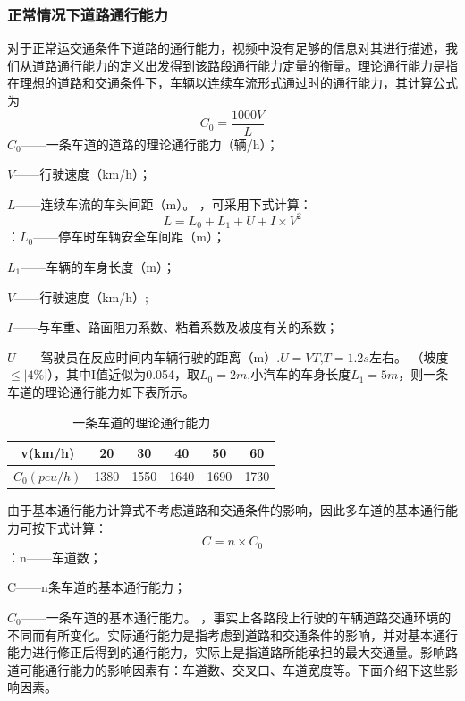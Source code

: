 \documentclass[UTF8,12.05pt]{ctexart}
\begin{document}
\subsubsection{正常情况下道路通行能力}
对于正常运交通条件下道路的通行能力，视频中没有足够的信息对其进行描述，我们从道路通行能力的定义出发得到该路段通行能力定量的衡量。理论通行能力是指在理想的道路和交通条件下，车辆以连续车流形式通过时的通行能力，其计算公式为
$$C_{0}=\frac{1000V}{L}$$
 $C_{0}$——一条车道的道路的理论通行能力（辆/h）；
\par$V$——行驶速度（km/h）；
\par$L$——连续车流的车头间距（m）。
，可采用下式计算：
$$L=L_{0}+L_{1}+U+I\times V^{2}$$
：$L_{0}$——停车时车辆安全车间距（m）；
\par$L_{1}$——车辆的车身长度（m）；
\par$V$——行驶速度（km/h）;
\par$I$——与车重、路面阻力系数、粘着系数及坡度有关的系数；
\par$U$——驾驶员在反应时间内车辆行驶的距离（m）.$U=VT$,$T=1.2s$左右。
（坡度$\leqslant |4\%|$），其中I值近似为0.054，取$L_{0}=2m$,小汽车的车身长度$L_{1}=5m$，则一条车道的理论通行能力如下表所示。
\begin{table}[H]
  \centering
  \caption{一条车道的理论通行能力}
  \begin{tabular}{c| c| c|c|c|c}
  \hline
  v(km/h)&20&30&40&50&60 \\ \hline
  $C_{0}(pcu/h)$&1380&1550&1640&1690&1730 \\ \hline
\end{tabular}
\end{table}
由于基本通行能力计算式不考虑道路和交通条件的影响，因此多车道的基本通行能力可按下式计算：
$$C=n\times C_{0}$$
：n——车道数；
\par C——n条车道的基本通行能力；
\par $C_{0}$——一条车道的基本通行能力。
\newline
{}，事实上各路段上行驶的车辆道路交通环境的不同而有所变化。实际通行能力是指考虑到道路和交通条件的影响，并对基本通行能力进行修正后得到的通行能力，实际上是指道路所能承担的最大交通量。影响路道可能通行能力的影响因素有：车道数、交叉口、车道宽度等。下面介绍下这些影响因素。
\end{document}
